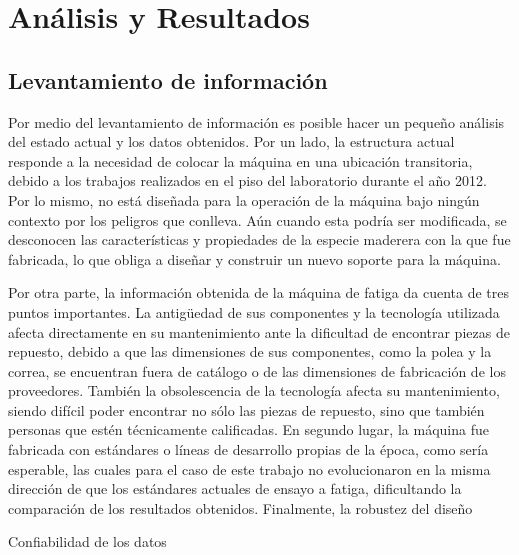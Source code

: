 \chapter{Análisis y Resultados}

\section{Levantamiento de información}
Por medio del levantamiento de información es posible hacer un pequeño análisis del estado actual y los datos obtenidos. Por un lado, la estructura actual responde a la necesidad de colocar la máquina en una ubicación transitoria, debido a los trabajos realizados en el piso del laboratorio durante el año 2012. Por lo mismo, no está diseñada para la operación de la máquina bajo ningún contexto por los peligros que conlleva. Aún cuando esta podría ser modificada, se desconocen las características y propiedades de la especie maderera con la que fue fabricada, lo que obliga a diseñar y construir un nuevo soporte para la máquina. 

Por otra parte, la información obtenida de la máquina de fatiga da cuenta de tres puntos importantes. La antigüedad de sus componentes y la tecnología utilizada afecta directamente en su mantenimiento ante la dificultad de encontrar piezas de repuesto, debido a que las dimensiones de sus componentes, como la polea y la correa, se encuentran fuera de catálogo o de las dimensiones de fabricación de los proveedores. También la obsolescencia de la tecnología afecta su mantenimiento, siendo difícil poder encontrar no sólo las piezas de repuesto, sino que también personas que estén técnicamente calificadas. En segundo lugar, la máquina fue fabricada con estándares o líneas de desarrollo propias de la época, como sería esperable, las cuales para el caso de este trabajo no evolucionaron en la misma dirección de que los estándares actuales de ensayo a fatiga, dificultando la comparación de los resultados obtenidos. Finalmente, la robustez del diseño 

Confiabilidad de los datos